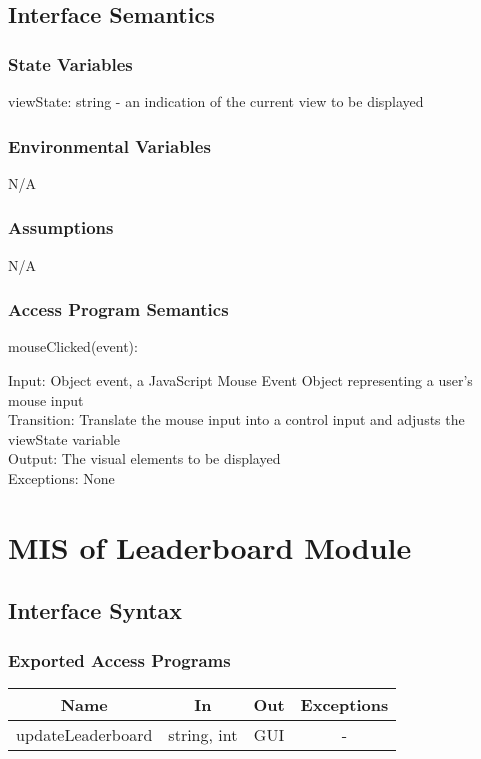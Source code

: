 \documentclass[12,english]{article}
\begin{document}
		\subsection{Interface Semantics}
		\subsubsection{State Variables}
		viewState: string - an indication of the current view to be displayed
		\subsubsection{Environmental Variables}
		N/A
		\subsubsection{Assumptions}
		N/A
		
		\subsubsection{Access Program Semantics}
		
		mouseClicked(event):
		
		Input: Object event, a JavaScript Mouse Event Object representing a user's mouse input\\
		
		Transition: Translate the mouse input into a control input and adjusts the viewState variable\\
		
		Output: The visual elements to be displayed\\
		
		Exceptions: None\\
\section{MIS of Leaderboard Module}
	\subsection{Interface Syntax}
		\subsubsection{Exported Access Programs}
		\begin{table}[!htbp]
		\begin{tabular}{|c|c|c|c|}
			\hline
			\label{SingleviewEAP}
			Name & In & Out & Exceptions \\ \hline
			updateLeaderboard & string, int & GUI & - \\ \hline
		\end{tabular}
	\end{table}
		
\end{document}
